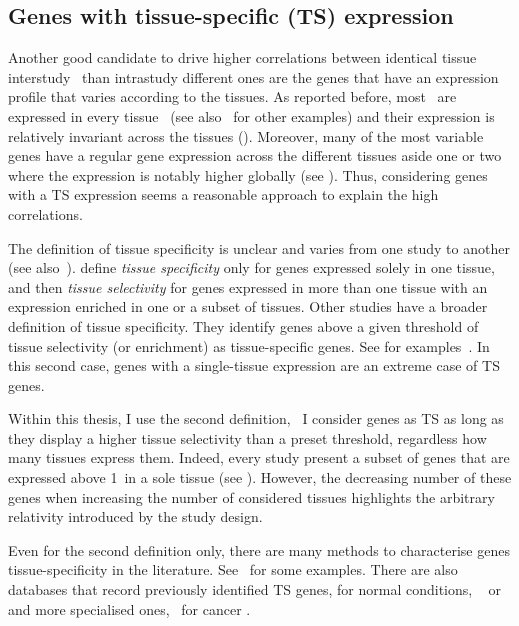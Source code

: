 \subsection{Genes with tissue-specific (TS) expression}\label{sub:TisSpeGene}

Another good candidate to drive higher correlations
between identical tissue interstudy \treps\ than intrastudy different ones
are the genes that have an expression profile
that varies according to the tissues.
As reported before,
most \mRNAs\ are expressed in every tissue~
(see also~\cite{Uhlen2015,GTExTranscript} for other examples) and
their expression is relatively invariant across the tissues ().
Moreover,
many of the most variable genes
have a regular gene expression across the different tissues
aside one or two where the expression is notably higher globally
(see ).
Thus,
considering genes with a \gls{TS} expression
seems a reasonable approach to explain the high correlations.

The definition of tissue specificity is unclear and
varies from one study to another (see also~\cite{Santos2015-rj}).
\cite{Liang2006-mk} define \emph{tissue specificity}
only for genes expressed solely in one tissue,
and then \emph{tissue selectivity} for genes expressed in more than one tissue
with an expression enriched in one or a subset of tissues.
Other studies have a broader definition of tissue specificity.
They identify genes above a given threshold of tissue selectivity (or enrichment)
as tissue-specific genes.
See for examples~\cite{Uhlen2014,Jiang2016-sv}.
In this second case,
genes with a single-tissue expression are an extreme case of \gls{TS} genes.

Within this thesis, I use the second definition,
\ie\ I consider genes as \gls{TS}
as long as they display a higher tissue selectivity than a preset threshold,
regardless how many tissues express them.
Indeed, every study present a subset of genes
that are expressed above 1\FPKM\
in a sole tissue (see ).
However, the decreasing number of these genes
when increasing the number of considered tissues highlights
the arbitrary relativity introduced by the study design.

Even for the second definition only,
there are many methods to characterise genes tissue-specificity in the literature.
See~\cite{Cavalli2011-bo,Xiao2010-mz,Karthik2016-mu,Kim2017-dz,Kryuchkova-Mostacci2017-mk,Kadota2006-eb,Yu2006-ha,Martinez2008-bm}
for some examples.
There are also databases that record previously identified \gls{TS} genes,
for normal conditions,
\eg\  or
and more specialised ones, \eg\ for cancer
.

